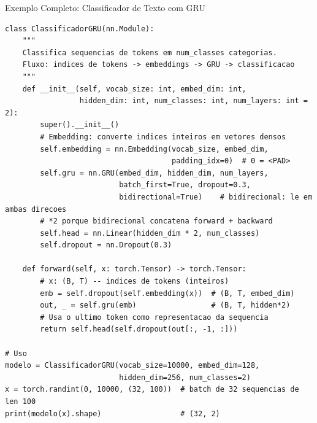 \documentclass[aspectratio=169, 10pt]{beamer}
\begin{document}
\begin{frame}[fragile]{Exemplo Completo: Classificador de Texto com GRU}
\begin{lstlisting}[style=small]
class ClassificadorGRU(nn.Module):
    """
    Classifica sequencias de tokens em num_classes categorias.
    Fluxo: indices de tokens -> embeddings -> GRU -> classificacao
    """
    def __init__(self, vocab_size: int, embed_dim: int,
                 hidden_dim: int, num_classes: int, num_layers: int = 2):
        super().__init__()
        # Embedding: converte indices inteiros em vetores densos
        self.embedding = nn.Embedding(vocab_size, embed_dim,
                                      padding_idx=0)  # 0 = <PAD>
        self.gru = nn.GRU(embed_dim, hidden_dim, num_layers,
                          batch_first=True, dropout=0.3,
                          bidirectional=True)    # bidirecional: le em ambas direcoes
        # *2 porque bidirecional concatena forward + backward
        self.head = nn.Linear(hidden_dim * 2, num_classes)
        self.dropout = nn.Dropout(0.3)

    def forward(self, x: torch.Tensor) -> torch.Tensor:
        # x: (B, T) -- indices de tokens (inteiros)
        emb = self.dropout(self.embedding(x))  # (B, T, embed_dim)
        out, _ = self.gru(emb)                 # (B, T, hidden*2)
        # Usa o ultimo token como representacao da sequencia
        return self.head(self.dropout(out[:, -1, :]))

# Uso
modelo = ClassificadorGRU(vocab_size=10000, embed_dim=128,
                          hidden_dim=256, num_classes=2)
x = torch.randint(0, 10000, (32, 100))  # batch de 32 sequencias de len 100
print(modelo(x).shape)                  # (32, 2)
\end{lstlisting}
\end{frame}

\end{document}

